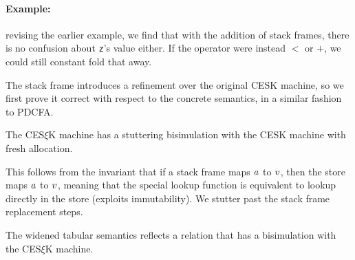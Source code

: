 
\paragraph{Example:} revising the earlier example, we find that with the addition of stack frames, there is no confusion about \texttt{z}'s value either.
%
If the operator were instead $<$ or $+$, we could still constant fold that away.

The stack frame introduces a refinement over the original CESK machine, so we first prove it correct with respect to the concrete semantics, in a similar fashion to PDCFA.
%
\begin{theorem}\label{thm:refinement}
  The CES$\xi$K machine has a stuttering bisimulation with the CESK machine with fresh allocation.
\end{theorem}
This follows from the invariant that if a stack frame maps $a$ to $v$, then the store maps $a$ to $v$, meaning that the special lookup function is equivalent to lookup directly in the store (exploits immutability).
%
We stutter past the stack frame replacement steps.
%
%
%
%
%

\begin{theorem}\label{thm:cfa2}
  The widened tabular semantics reflects a relation that has a bisimulation with the CES$\xi$K machine.
\end{theorem}


